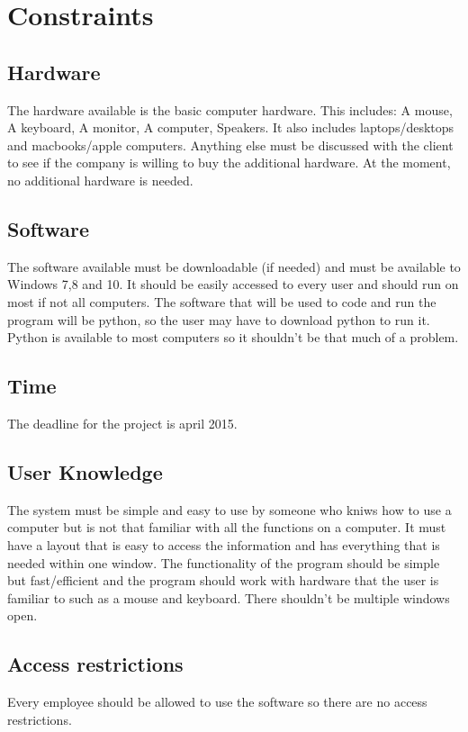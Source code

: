 \section{Constraints}

\subsection{Hardware}
The hardware available is the basic computer hardware. This includes: A mouse, A keyboard, A monitor, A computer, Speakers. It also includes laptops/desktops and macbooks/apple computers. Anything else must be discussed with the client to see if the company is willing to buy the additional hardware. At the moment, no additional hardware is needed.

\subsection{Software}
The software available must be downloadable (if needed) and must be available to Windows 7,8 and 10. It should be easily accessed to every user and should run on most if not all computers. The software that will be used to code and run the program will be python, so the user may have to download python to run it. Python is available to most computers so it shouldn't be that much of a problem.
\subsection{Time}

The deadline for the project is april 2015.

\subsection{User Knowledge}

The system must be simple and easy to use by someone who kniws how to use a computer but is not that familiar with all the functions on a computer. It must have a layout that is easy to access the information and has everything that is needed within one window. The functionality of the program should be simple but fast/efficient and the program should work with hardware that the user is familiar to such as a mouse and keyboard. There shouldn't be multiple windows open. 

\subsection{Access restrictions}
Every employee should be allowed to use the software so there are no access restrictions.

